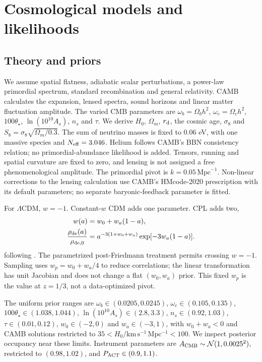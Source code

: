 \documentclass[fleqn,usenatbib]{mnras}
\newcommand{\lcdm}{$\Lambda$CDM}
\newcommand{\hunit}{\mathrm{km\,s^{-1}\,Mpc^{-1}}}
\newcommand{\rd}{r_{\rm d}}
\begin{document}
\section{Cosmological models and likelihoods}
\subsection{Theory and priors}
We assume spatial flatness, adiabatic scalar perturbations, a power-law
primordial spectrum, standard recombination and general relativity. CAMB
\citep{CAMB} calculates the expansion, lensed spectra, sound horizons and linear
matter fluctuation amplitude. The varied CMB parameters are
$\omega_b=\Omega_bh^2$, $\omega_c=\Omega_ch^2$, $100\theta_\star$,
$\ln(10^{10}A_s)$, $n_s$ and $\tau$. We derive $H_0$, $\Omega_m$, $\rd$,
the cosmic age, $\sigma_8$ and $S_8=\sigma_8\sqrt{\Omega_m/0.3}$.
The sum of neutrino masses is fixed to $0.06$ eV, with one massive species and
$N_{\rm eff}=3.046$. Helium follows CAMB's BBN consistency relation; no
primordial-abundance likelihood is added. Tensors, running and spatial curvature
are fixed to zero, and lensing is not assigned a free phenomenological amplitude.
The primordial pivot is $k=0.05\,\mathrm{Mpc}^{-1}$. Non-linear corrections to
the lensing calculation use CAMB's HMcode-2020 prescription with its default
parameters; no separate baryonic-feedback parameter is fitted.

For \lcdm, $w=-1$. Constant-$w$ CDM adds one parameter. CPL adds two,
\begin{equation}
 \begin{aligned}
 w(a)&=w_0+w_a(1-a),\\
 \frac{\rho_{\rm de}(a)}{\rho_{{\rm de},0}}
 &=a^{-3(1+w_0+w_a)}\exp[-3w_a(1-a)].
 \end{aligned}
\end{equation}
following \citet{CPL,Linder}. The parametrized post-Friedmann treatment permits
crossing $w=-1$. Sampling uses $w_p=w_0+w_a/4$ to reduce correlations; the linear
transformation has unit Jacobian and does not change a flat $(w_0,w_a)$ prior.
This fixed $w_p$ is the value at $z=1/3$, not a data-optimized pivot.

The uniform prior ranges are $\omega_b\in(0.0205,0.0245)$,
$\omega_c\in(0.105,0.135)$, $100\theta_\star\in(1.038,1.044)$,
$\ln(10^{10}A_s)\in(2.8,3.3)$, $n_s\in(0.92,1.03)$,
$\tau\in(0.01,0.12)$, $w_0\in(-2,0)$ and $w_a\in(-3,1)$,
with $w_0+w_a<0$ and CAMB solutions restricted to
$35<H_0/\hunit<100$. We inspect posterior occupancy near these limits.
Instrument parameters are $A_{\rm CMB}\sim\mathcal{N}(1,0.0025^2)$, restricted
to $(0.98,1.02)$, and $P_{\rm ACT}\in(0.9,1.1)$.
\end{document}
